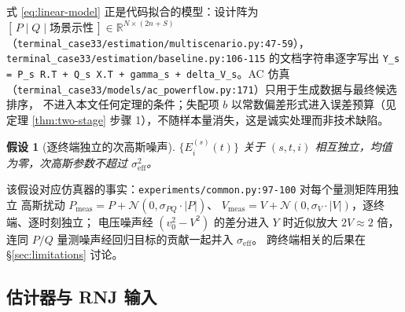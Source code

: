\documentclass[UTF8,11pt]{ctexart}
\newtheorem{assumption}{假设}
\begin{document}
式 \eqref{eq:linear-model} 正是代码拟合的模型：设计阵为
$[\,P\;|\;Q\;|\;\text{场景示性}\,]\in\mathbb{R}^{N\times(2n+S)}$
（\texttt{terminal\_case33/estimation/multiscenario.py:47-59}），
\texttt{terminal\_case33/estimation/baseline.py:106-115} 的文档字符串逐字写出
\texttt{Y\_s = P\_s R.T + Q\_s X.T + gamma\_s + delta\_V\_s}。AC 仿真
（\texttt{terminal\_case33/models/ac\_powerflow.py:171}）只用于生成数据与最终候选排序，
不进入本文任何定理的条件；失配项 $b$ 以常数偏差形式进入误差预算（见定理
\ref{thm:two-stage} 步骤 1），不随样本量消失，这是诚实处理而非技术缺陷。

\begin{assumption}[逐终端独立的次高斯噪声]
\label{ass:noise}
$\{E_i^{(s)}(t)\}$ 关于 $(s,t,i)$ 相互独立，均值为零，次高斯参数不超过
$\sigma_{\mathrm{eff}}^2$。
\end{assumption}

该假设对应仿真器的事实：\texttt{experiments/common.py:97-100} 对每个量测矩阵用独立
高斯扰动 $P_{\mathrm{meas}}=P+\mathcal{N}(0,\sigma_{PQ}\cdot|P|)$、
$V_{\mathrm{meas}}=V+\mathcal{N}(0,\sigma_V\cdot|V|)$，逐终端、逐时刻独立；
电压噪声经 $(v_0^2-V^2)$ 的差分进入 $Y$ 时近似放大 $2V\approx 2$ 倍，
连同 $P/Q$ 量测噪声经回归目标的贡献一起并入 $\sigma_{\mathrm{eff}}$。
跨终端相关的后果在 \S\ref{sec:limitations} 讨论。

\subsection{估计器与 RNJ 输入}
\end{document}
